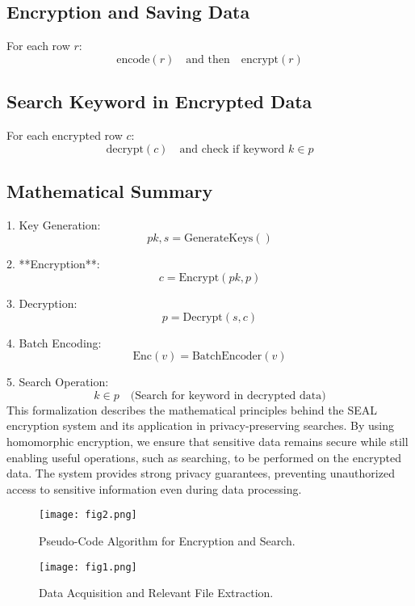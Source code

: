 \documentclass[conference]{IEEEtran}
\begin{document}
\subsection{Encryption and Saving Data}
For each row \( r \):
\[
\text{encode}(r) \quad \text{and then} \quad \text{encrypt}(r)
\]

\subsection{Search Keyword in Encrypted Data}
For each encrypted row \( c \):
\[
\text{decrypt}(c) \quad \text{and check if keyword } k \in p
\]

\subsection{Mathematical Summary}

1. Key Generation:
\[
pk, s = \text{GenerateKeys}()
\]

2. **Encryption**:
\[
c = \text{Encrypt}(pk, p)
\]

3. Decryption:
\[
p = \text{Decrypt}(s, c)
\]

4. Batch Encoding:
\[
\text{Enc}(v) = \text{BatchEncoder}(v)
\]

5. Search Operation:
\[
k \in p \quad \text{(Search for keyword in decrypted data)}
\]
This formalization describes the mathematical principles behind the SEAL encryption system and its application in privacy-preserving searches. By using homomorphic encryption, we ensure that sensitive data remains secure while still enabling useful operations, such as searching, to be performed on the encrypted data. The system provides strong privacy guarantees, preventing unauthorized access to sensitive information even during data processing.

\begin{figure}[htbp]
\centerline{\texttt{[image: fig2.png]}}
\caption{Pseudo-Code Algorithm for Encryption and Search.}
\label{fig1}
\end{figure}

\begin{figure}[htbp]
\centerline{\texttt{[image: fig1.png]}}
\caption{Data Acquisition and Relevant File Extraction.}
\label{fig2}
\end{figure}
\end{document}
